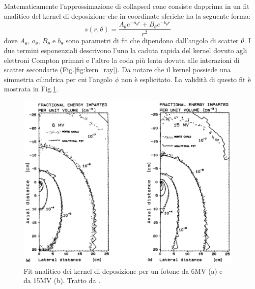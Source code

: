 {Matematicamente l'approssimazione di collapsed cone consiste dapprima in un fit analitico del kernel di deposizione che in coordinate sferiche ha la seguente forma:
\begin{equation}
\label{eq:kern_fit}
s(r,\theta) = \frac{A_\theta e^{-a_\theta r} + B_\theta e^{-b_\theta r}}{r^2}
\end{equation}
dove $A_\theta,\,a_\theta,\,B_\theta$ e $b_\theta$ sono parametri di fit che dipendono dall'angolo di scatter $\theta$. I due termini esponenziali descrivono l'uno la caduta rapida del kernel dovuto agli elettroni Compton primari e l'altro la coda più lenta dovuta alle interazioni di scatter secondarie (Fig.\ref{fig:kern_ray}). Da notare che il kernel possiede una simmetria cilindrica per cui l'angolo $\phi$ non è esplicitato. La validità di questo fit è mostrata in Fig.\ref{fig:kern_fit}.
\begin{figure}
\centering
\includegraphics[width=.8\textwidth]{./cap1/kern_fit.png}
\caption{Fit analitico dei kernel di deposizione per un fotone da 6MV (a) e da 15MV (b). Tratto da \cite{Ahnesjo1989}.}
\label{fig:kern_fit}
\end{figure}

}
